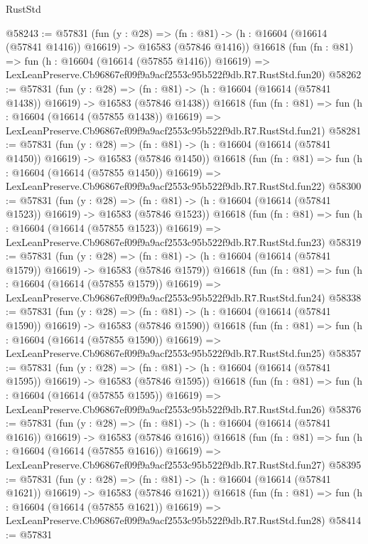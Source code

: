 \begin{lexlean}{RustStd}
\begin{coremodule}
@58243 := @57831
    (fun (y : @28) =>
    (fn : @81) -> (h : @16604 (@16614 (@57841 @1416)) @16619) -> @16583 (@57846 @1416))
    @16618
    (fun (fn : @81) =>
    fun (h : @16604 (@16614 (@57855 @1416)) @16619) =>
    LexLeanPreserve.Cb96867ef09f9a9acf2553c95b522f9db.R7.RustStd.fun20)
@58262 := @57831
    (fun (y : @28) =>
    (fn : @81) -> (h : @16604 (@16614 (@57841 @1438)) @16619) -> @16583 (@57846 @1438))
    @16618
    (fun (fn : @81) =>
    fun (h : @16604 (@16614 (@57855 @1438)) @16619) =>
    LexLeanPreserve.Cb96867ef09f9a9acf2553c95b522f9db.R7.RustStd.fun21)
@58281 := @57831
    (fun (y : @28) =>
    (fn : @81) -> (h : @16604 (@16614 (@57841 @1450)) @16619) -> @16583 (@57846 @1450))
    @16618
    (fun (fn : @81) =>
    fun (h : @16604 (@16614 (@57855 @1450)) @16619) =>
    LexLeanPreserve.Cb96867ef09f9a9acf2553c95b522f9db.R7.RustStd.fun22)
@58300 := @57831
    (fun (y : @28) =>
    (fn : @81) -> (h : @16604 (@16614 (@57841 @1523)) @16619) -> @16583 (@57846 @1523))
    @16618
    (fun (fn : @81) =>
    fun (h : @16604 (@16614 (@57855 @1523)) @16619) =>
    LexLeanPreserve.Cb96867ef09f9a9acf2553c95b522f9db.R7.RustStd.fun23)
@58319 := @57831
    (fun (y : @28) =>
    (fn : @81) -> (h : @16604 (@16614 (@57841 @1579)) @16619) -> @16583 (@57846 @1579))
    @16618
    (fun (fn : @81) =>
    fun (h : @16604 (@16614 (@57855 @1579)) @16619) =>
    LexLeanPreserve.Cb96867ef09f9a9acf2553c95b522f9db.R7.RustStd.fun24)
@58338 := @57831
    (fun (y : @28) =>
    (fn : @81) -> (h : @16604 (@16614 (@57841 @1590)) @16619) -> @16583 (@57846 @1590))
    @16618
    (fun (fn : @81) =>
    fun (h : @16604 (@16614 (@57855 @1590)) @16619) =>
    LexLeanPreserve.Cb96867ef09f9a9acf2553c95b522f9db.R7.RustStd.fun25)
@58357 := @57831
    (fun (y : @28) =>
    (fn : @81) -> (h : @16604 (@16614 (@57841 @1595)) @16619) -> @16583 (@57846 @1595))
    @16618
    (fun (fn : @81) =>
    fun (h : @16604 (@16614 (@57855 @1595)) @16619) =>
    LexLeanPreserve.Cb96867ef09f9a9acf2553c95b522f9db.R7.RustStd.fun26)
@58376 := @57831
    (fun (y : @28) =>
    (fn : @81) -> (h : @16604 (@16614 (@57841 @1616)) @16619) -> @16583 (@57846 @1616))
    @16618
    (fun (fn : @81) =>
    fun (h : @16604 (@16614 (@57855 @1616)) @16619) =>
    LexLeanPreserve.Cb96867ef09f9a9acf2553c95b522f9db.R7.RustStd.fun27)
@58395 := @57831
    (fun (y : @28) =>
    (fn : @81) -> (h : @16604 (@16614 (@57841 @1621)) @16619) -> @16583 (@57846 @1621))
    @16618
    (fun (fn : @81) =>
    fun (h : @16604 (@16614 (@57855 @1621)) @16619) =>
    LexLeanPreserve.Cb96867ef09f9a9acf2553c95b522f9db.R7.RustStd.fun28)
@58414 := @57831

\end{coremodule}
\end{lexlean}
